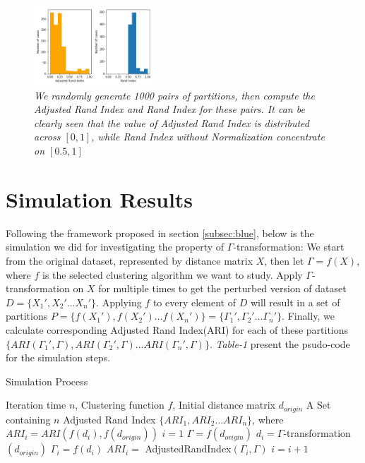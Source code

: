 \documentclass{uonmathreport}
\begin{document}
\begin{figure}[H]
 \begin{center}
   \includegraphics[width=0.4\textwidth]{adjusted.png}
 \end{center}
 \caption{\textit{We randomly generate 1000 pairs of partitions, then compute the Adjusted Rand Index and Rand Index for these pairs. It can be clearly seen that the value of Adjusted Rand Index is distributed across $[0,1]$, while Rand Index without Normalization concentrate on $[0.5,1]$}}
 \label{fig:bsd}
\end{figure}


\section{Simulation Results} \label{sec:red}
Following the framework proposed in section \ref{subsec:blue}, below is the simulation we did for investigating the property of $\Gamma$-transformation: We start from the original dataset, represented by distance matrix $X$, then let $\Gamma = f(X)$, where $f$ is the selected clustering algorithm we want to study. Apply $\Gamma$-transformation on $X$ for multiple times to get the perturbed version of dataset $D = \{X_1',X_2'\ldots X_n'\}$. Applying $f$ to every element of $D$ will result in a set of partitions $P = \{f(X_1'),f(X_2')\ldots f(X_n')\}=\{\Gamma_1',\Gamma_2' \ldots \Gamma_n' \}$. Finally, we calculate corresponding Adjusted Rand Index(ARI) for each of these partitions $\{ARI(\Gamma_1',\Gamma),ARI(\Gamma_2',\Gamma)\ldots ARI(\Gamma_n',\Gamma)\}$. \textit{Table-1} present the psudo-code for the simulation steps.

\begin{algorithm}
    \caption{Simulation Process}
  \begin{algorithmic}[1]
    \INPUT Iteration time $n$, Clustering function $f$, Initial distance matrix $d_{origin}$
    \OUTPUT A Set containing $n$ Adjusted Rand Index $\{ARI_1,ARI_2\ldots ARI_n\}$, where $ARI_i = ARI(f(d_i),f(d_{origin}))$
	\STATE $i=1$    
    \STATE $\Gamma = f(d_{origin})$
      \STATE $d_i=\Gamma$-transformation$(d_{origin})$
      \STATE $\Gamma_i=f(d_i)$
      \STATE $ARI_i =$ AdjustedRandIndex$(\Gamma_i,\Gamma)$
      \STATE $i = i + 1$
    \ENDWHILE
  \end{algorithmic}
\end{algorithm}
\end{document}
